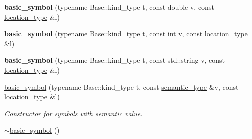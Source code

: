 \begin{DoxyCompactItemize}
\item 
{\bfseries basic\+\_\+symbol} (typename Base\+::kind\+\_\+type t, const double v, const \hyperlink{classEquationParser_1_1Parser_a9c08ca33906dfb521b4ec5989e3620bf}{location\+\_\+type} \&l)\hypertarget{structEquationParser_1_1Parser_1_1basic__symbol_a2a3e48955c45f4c130876769901bf8e0}{}\label{structEquationParser_1_1Parser_1_1basic__symbol_a2a3e48955c45f4c130876769901bf8e0}

\item 
{\bfseries basic\+\_\+symbol} (typename Base\+::kind\+\_\+type t, const int v, const \hyperlink{classEquationParser_1_1Parser_a9c08ca33906dfb521b4ec5989e3620bf}{location\+\_\+type} \&l)\hypertarget{structEquationParser_1_1Parser_1_1basic__symbol_a36ce3f83e22f490b32beb68495e2628e}{}\label{structEquationParser_1_1Parser_1_1basic__symbol_a36ce3f83e22f490b32beb68495e2628e}

\item 
{\bfseries basic\+\_\+symbol} (typename Base\+::kind\+\_\+type t, const std\+::string v, const \hyperlink{classEquationParser_1_1Parser_a9c08ca33906dfb521b4ec5989e3620bf}{location\+\_\+type} \&l)\hypertarget{structEquationParser_1_1Parser_1_1basic__symbol_acd6411a9ab52f90961960e992e91b1a2}{}\label{structEquationParser_1_1Parser_1_1basic__symbol_acd6411a9ab52f90961960e992e91b1a2}

\item 
\hyperlink{structEquationParser_1_1Parser_1_1basic__symbol_aa5293c259d4e6a166a556a0a85bfd613}{basic\+\_\+symbol} (typename Base\+::kind\+\_\+type t, const \hyperlink{classEquationParser_1_1Parser_a86482685d5f3d44fff68fd4150bbd2dd}{semantic\+\_\+type} \&v, const \hyperlink{classEquationParser_1_1Parser_a9c08ca33906dfb521b4ec5989e3620bf}{location\+\_\+type} \&l)\hypertarget{structEquationParser_1_1Parser_1_1basic__symbol_aa5293c259d4e6a166a556a0a85bfd613}{}\label{structEquationParser_1_1Parser_1_1basic__symbol_aa5293c259d4e6a166a556a0a85bfd613}

\begin{DoxyCompactList}\small\item\em Constructor for symbols with semantic value. \end{DoxyCompactList}\item 
\hyperlink{structEquationParser_1_1Parser_1_1basic__symbol_adecad196c1e623614f818d540ff626c3}{$\sim$basic\+\_\+symbol} ()\hypertarget{structEquationParser_1_1Parser_1_1basic__symbol_adecad196c1e623614f818d540ff626c3}{}\label{structEquationParser_1_1Parser_1_1basic__symbol_adecad196c1e623614f818d540ff626c3}


\end{DoxyCompactItemize}
